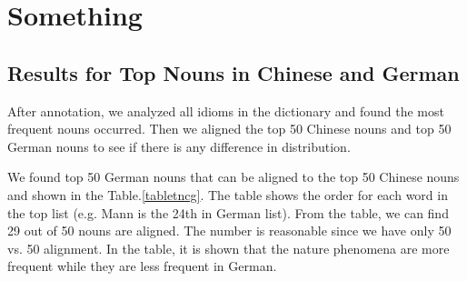 \section{Something}

\subsection{Results for Top Nouns in Chinese and German}\label{firstresult}
After annotation, we analyzed all idioms in the dictionary and found the most frequent nouns occurred. Then we aligned the top 50 Chinese nouns and top 50 German nouns to see if there is any difference in distribution. 

We found top 50 German nouns that can be aligned to the top 50 Chinese nouns and shown in the Table.\ref{tabletncg}. The table shows the order for each word in the top list (e.g. Mann is the 24th in German list). From the table, we can find 29 out of 50 nouns are aligned. The number is reasonable since we have only 50 vs. 50 alignment. In the table, it is shown that the nature phenomena are more frequent while they are less frequent in German. 

